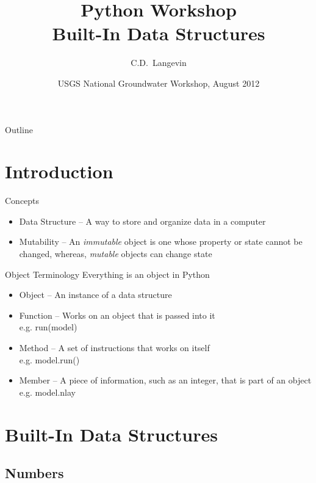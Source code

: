 \documentclass{beamer}
\title[]{Python Workshop\\
Built-In Data Structures}
\author[Langevin] %
{C.D.~Langevin}
\institute[USGS] %
{
  U.S. Geological Survey\\
  Reston, Virginia, USA
  }
\date[UQ12] %
{USGS National Groundwater Workshop, August 2012}
\begin{document}
\begin{frame}
  \titlepage
\end{frame}

\begin{frame}{Outline}
\tableofcontents
\end{frame}

\section{Introduction}
\begin{frame}[fragile]{Concepts}
\begin{itemize}
\item{Data Structure -- A way to store and organize data in a computer}
\item{Mutability -- An \emph{immutable} object is one whose property or state cannot be changed, whereas, \emph{mutable} objects can change state}
\end{itemize}
\end{frame}

\begin{frame}[fragile]{Object Terminology}
Everything is an object in Python
\begin{itemize}
\item{Object -- An instance of a data structure}
\item{Function -- Works on an object that is passed into it\\ e.g. {\color{blue}run(model)}}
\item{Method -- A set of instructions that works on itself\\ e.g. {\color{blue}model.run()}}
\item{Member -- A piece of information, such as an integer, that is part of an object\\ e.g. {\color{blue}model.nlay}}
\end{itemize}
\end{frame}


\section{Built-In Data Structures}

\subsection{Numbers}
\end{document}
